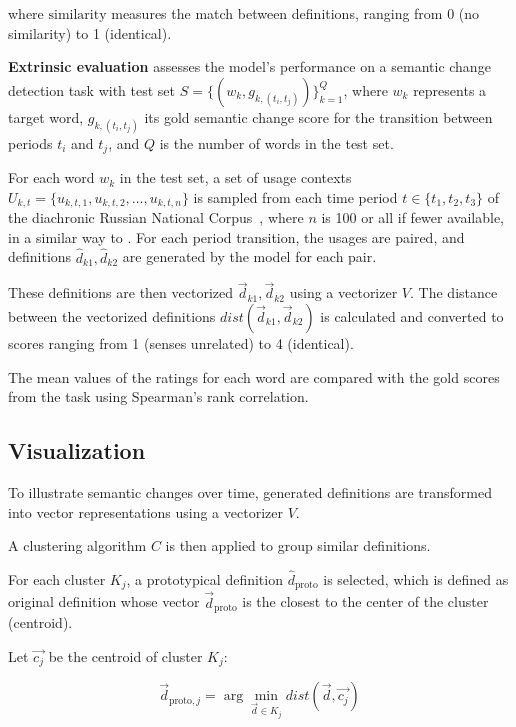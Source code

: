 \documentclass[11pt]{article}
\begin{document}
where \( \text{similarity} \) measures the match between definitions, ranging from 0 (no similarity) to 1 (identical).

\textbf{Extrinsic evaluation} assesses the model's performance on
a semantic change detection task with test set \( S = \{(w_k, g_{k,(t_i,t_j)})\}_{k=1}^{Q} \),
where \( w_k \) represents a target word, \( g_{k,(t_i,t_j)} \) its gold semantic change score for the transition between periods \( t_i \) and \( t_j \), and \( Q \) is the number of words in the test set.

For each word \( w_k \) in the test set,
a set of usage contexts \( U_{k,t} = \{u_{k,t,1}, u_{k,t,2}, \dots, u_{k,t,n}\} \) is sampled from each time period \( t \in \{t_1, t_2, t_3\} \) of the diachronic Russian National Corpus~\cite{Ruscorpora},
where \( n \) is 100 or all if fewer available, in a similar way to .
For each period transition, the usages are paired, and definitions \( \hat{d}_{k1}, \hat{d}_{k2}\) are generated by the model for each pair.

These definitions are then vectorized \( \vec{d}_{k1}, \vec{d}_{k2} \) using a vectorizer \( V \).
The distance between the vectorized definitions \( dist(\vec{d}_{k1}, \vec{d}_{k2}) \) is calculated and converted to scores ranging from 1 (senses unrelated) to 4 (identical).

The mean values of the ratings for each word are compared with the gold scores from the task
using Spearman's rank correlation.

\subsection{Visualization}

To illustrate semantic changes over time, generated definitions are transformed into vector representations using a vectorizer \( V \).

A clustering algorithm \( C \) is then applied to group similar definitions.

For each cluster \( K_j \), a prototypical definition \( \hat{d}_{\text{proto}} \) is selected,
which is defined as original definition whose vector \( \vec{d}_{\text{proto}} \) is the closest to the center of the cluster (centroid).

Let \( \vec{c_j} \) be the centroid of cluster \( K_j \):

\begin{equation}
\vec{d}_{\text{proto}, j} = \arg\min_{\vec{d} \in K_j} dist(\vec{d}, \vec{c_j})
\end{equation}
\end{document}
